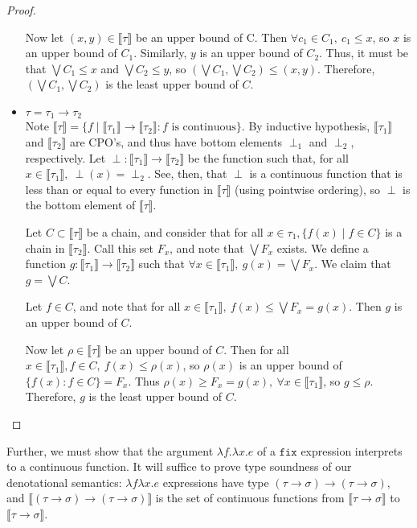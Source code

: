 \begin{proof}
\begin{itemize}
Now let $(x,y) \in \llbracket \tau \rrbracket$ be an upper bound of C. Then $\forall c_1 \in C_1, \ c_1 \leq x$, so $x$ is an upper 
bound of $C_1$. Similarly, $y$ is an upper bound of $C_2$. Thus, it must be that $\bigvee C_1 \leq x$ and 
$\bigvee C_2 \leq y$, so $(\bigvee C_1, \bigvee C_2) \leq (x,y)$. Therefore, $(\bigvee C_1, \bigvee C_2)$ is the least upper
bound of $C$.

\item $\tau = \tau_1 \rightarrow \tau_2$ \\ 
Note $\llbracket \tau \rrbracket = \{f \mid \llbracket \tau_1 \rrbracket \rightarrow \llbracket \tau_2 \rrbracket : f \text{ is continuous}\}
$. By inductive hypothesis, $\llbracket \tau_1 \rrbracket$ and $\llbracket \tau_2 \rrbracket$ are CPO's, and thus have bottom
elements $\perp_1$ and $\perp_2$, respectively. Let $\perp: \llbracket \tau_1 \rrbracket \rightarrow \llbracket \tau_2 
\rrbracket$ be the function such that, for all $ x \in \llbracket \tau_1 \rrbracket, \ \perp(x) = \perp_2$. See, then, that 
$\perp$ is a continuous function that is less than or equal to every function in $\llbracket \tau \rrbracket$ (using pointwise
ordering), so $\perp$ is the bottom element of $\llbracket \tau \rrbracket$.  

Let $C \subset \llbracket \tau \rrbracket$ be a 
chain, and consider that for all $ x \in \tau_1, \{f(x) \mid f \in C\}$ is a chain in $\llbracket \tau_2 \rrbracket$. Call this set $F_x$,
and note that $\bigvee F_x$ exists. We define a function $g: \llbracket \tau_1 \rrbracket \rightarrow \llbracket \tau_2 \rrbracket$ 
such that $\forall x \in \llbracket \tau_1 \rrbracket, \ g(x) = \bigvee F_x$. We claim that $g = \bigvee C$. 

Let $f \in C$, and note that for all $ x \in \llbracket \tau_1 \rrbracket, \ f(x) \leq \bigvee F_x =g(x)$. Then $g$ is an upper bound of $C$.

Now let $\rho \in \llbracket \tau \rrbracket$ be an upper bound of $C$. Then for all $ x \in \llbracket \tau_1 \rrbracket, f \in C, \ f(x) \leq \rho(x)$, so $\rho(x)$ is an upper bound of $\{f(x) : f \in C\} = F_x$. Thus $\rho(x) \geq F_x = g(x), \ \forall x \in 
\llbracket \tau_1 \rrbracket$, so $g \leq \rho$. Therefore, $g$ is the least upper bound of $C$.
\end{itemize} 
\end{proof}
%

Further, we must show that the argument $\lambda f.\lambda x.e$ of a $\texttt{fix}$ expression interprets to a continuous function. It will suffice to prove type
soundness of our denotational semantics: $\lambda f\lambda x.e$ expressions have type $(\tau \rightarrow \sigma) \rightarrow (\tau \rightarrow \sigma)$, and 
$\llbracket (\tau \rightarrow \sigma) \rightarrow (\tau \rightarrow \sigma) \rrbracket$ is the set of continuous functions from $\llbracket \tau \rightarrow \sigma \rrbracket$ to
$\llbracket \tau \rightarrow \sigma \rrbracket$. 

